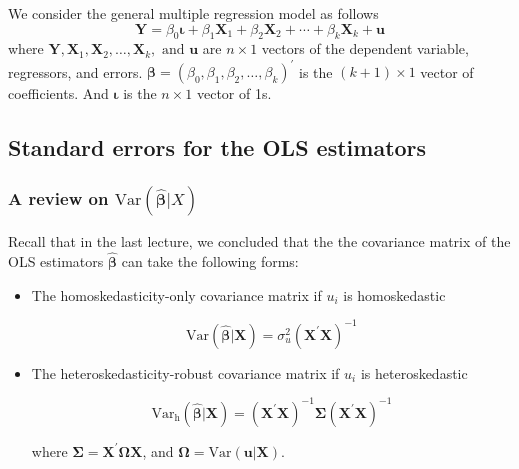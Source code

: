 \documentclass[a4paper,11pt]{article}
\newcommand{\var}{\mathrm{Var}}
\begin{document}
We consider the general multiple regression model as follows
\begin{equation}
\label{eq:jnt-hyp-mod}
\mathbf{Y} = \beta_0 \boldsymbol{\iota} + \beta_1 \mathbf{X}_1 + \beta_2 \mathbf{X}_2 + \cdots + \beta_k \mathbf{X}_k + \mathbf{u}
\end{equation}
where \(\mathbf{Y}, \mathbf{X}_1, \mathbf{X}_2, \ldots, \mathbf{X}_k, \text{ and } \mathbf{u}\) are \(n
\times 1\) vectors of the dependent variable, regressors, and
errors. \(\boldsymbol{\beta} = (\beta_0, \beta_1, \beta_2, \ldots,
\beta_k)^{\prime}\) is the \((k+1) \times 1\) vector of coefficients. And
\(\boldsymbol{\iota}\) is the \(n \times 1\) vector of 1s.

\subsection{Standard errors for the OLS estimators}
\label{sec:orgb35be3b}

\subsubsection*{A review on \(\var(\hat{\boldsymbol{\beta}}|X)\)}
\label{sec:org3a2b102}

Recall that in the last lecture, we concluded that the the covariance
matrix of the OLS estimators \(\hat{\boldsymbol{\beta}}\) can take the
following forms:

\begin{itemize}
\item The homoskedasticity-only covariance matrix if \(u_i\) is
homoskedastic

\begin{equation}
\label{eq:varbhat-hm-1}
\var(\hat{\boldsymbol{\beta}} | \mathbf{X}) = \sigma^2_u (\mathbf{X}^{\prime} \mathbf{X})^{-1}
\end{equation}

\item The heteroskedasticity-robust covariance matrix if \(u_i\) is
heteroskedastic

\begin{equation}
\label{eq:varbhat-ht-1}
\var_{\mathrm{h}}(\hat{\boldsymbol{\beta}} | \mathbf{X}) = \left(\mathbf{X}^{\prime} \mathbf{X}\right)^{-1} \boldsymbol{\Sigma} (\mathbf{X}^{\prime} \mathbf{X})^{-1}
\end{equation}

where \(\boldsymbol{\Sigma} = \mathbf{X}^{\prime} \boldsymbol{\Omega}
  \mathbf{X}\), and \(\mathbf{\Omega} = \var(\mathbf{u} |
  \mathbf{X})\).
\end{itemize}
\end{document}
